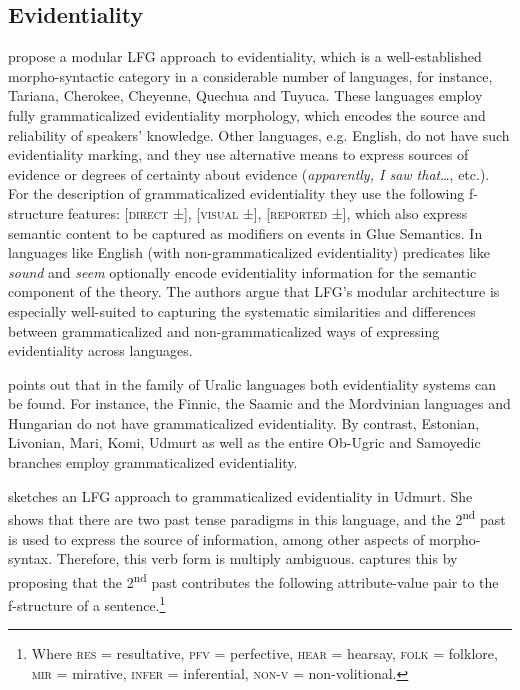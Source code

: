 \documentclass[output=paper,hidelinks]{langscibook}
\begin{document}
\subsection{Evidentiality}
\label{sec:FinnoUgric:7.2}

\citet{AsudehToivonen2017} propose a modular LFG approach to evidentiality, which is a well-established morpho-syntactic category in a considerable number of languages, for instance, Tariana, Cherokee, Cheyenne, Quechua and Tuyuca. These languages employ fully grammaticalized evidentiality morphology, which encodes the source and reliability of speakers' knowledge. Other languages, e.g. English, do not have such evidentiality marking, and they use alternative means to express sources of evidence or degrees of certainty about evidence (\textit{apparently, I saw that}…, etc.). For the description of grammaticalized evidentiality they use the following f-structure features: [\textsc{direct} ±], [\textsc{visual} ±], [\textsc{reported} ±], which also express semantic content to be captured as modifiers on events in Glue Semantics. In languages like English (with non-grammaticalized evidentiality) predicates like \textit{sound} and \textit{seem} optionally encode evidentiality information for the semantic component of the theory. The authors argue that LFG's modular architecture is especially well-suited to capturing the systematic similarities and differences between grammaticalized and non-grammaticalized ways of expressing evidentiality across languages.

\citet{Szabo2021} points out that in the family of Uralic languages both evidentiality systems can be found. For instance, the Finnic, the Saamic and the Mordvinian languages and Hungarian do not have grammaticalized evidentiality. By contrast, Estonian, Livonian, Mari, Komi, Udmurt as well as the entire Ob-Ugric and Samoyedic branches employ grammaticalized evidentiality.

\citet{Szabo2021} sketches an LFG approach to grammaticalized evidentiality in Udmurt. She shows that there are two past tense paradigms in this language, and the 2\textsuperscript{nd} past is used to express the source of information, among other aspects of morpho-syntax. Therefore, this verb form is multiply ambiguous. \citet[82]{Szabo2021} captures this by proposing that the 2\textsuperscript{nd} past contributes the following attribute-value pair to the f-structure of a sentence.\footnote{Where \textsc{res} = resultative, \textsc{pfv} = perfective, \textsc{hear} = hearsay, \textsc{folk} = folklore, \textsc{mir} = mirative, \textsc{infer} = inferential, \textsc{non-v} = non-volitional.}
\end{document}
